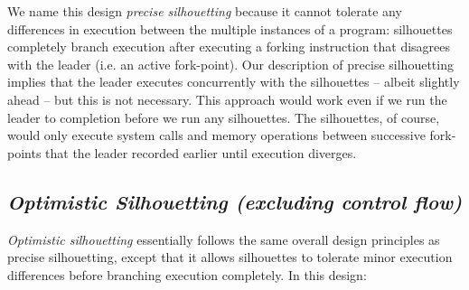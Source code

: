 \noindent We name this design {\em precise silhouetting} because
it cannot tolerate any differences in execution
between the multiple instances of a program:
silhouettes completely branch
execution after executing a
forking instruction that disagrees
with the leader (i.e. an active fork-point). 
Our description of precise silhouetting implies
that the leader executes concurrently
with the silhouettes -- albeit slightly ahead --
but this is not necessary.
This approach would work even
if we run the leader to completion
before we run any silhouettes. 
The silhouettes, of course, would only execute system calls and memory
operations between successive fork-points that the leader recorded earlier
until execution diverges.

\subsection{\em Optimistic Silhouetting (excluding control flow)}\label{opt:sil}
{\em Optimistic silhouetting} essentially follows the 
same overall design principles
as precise silhouetting,
except that it allows silhouettes
to tolerate minor execution differences 
before branching execution completely.
In this design:

